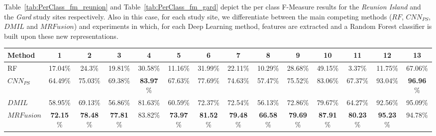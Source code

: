 \documentclass[journal]{IEEEtran}
\newcommand{\method}{$MRFusion$}
\begin{document}
Table~\ref{tab:PerClass_fm_reunion} and Table~\ref{tab:PerClass_fm_gard} depict the per class F-Measure results for the \textit{Reunion Island} and the \textit{Gard} study sites respectively. Also in this case, for each study site, we differentiate between the main competing methods ($RF$, $CNN_{PS}$, $DMIL$ and \method) and experiments in which, for each Deep Learning method, features are extracted and a Random Forest classifier is built upon these new representations. 

\begin{table*}[!ht]
\scriptsize
\centering
\begin{tabular}{|l||c|c|c|c|c|c|c|c|c|c|c|c|c|}
	\hline
\textbf{Method} & 1 & 2 & 3 & 4 & 5 & 6 & 7 & 8 & 9 & 10 & 11 & 12 & 13\\  \hline \hline
RF & 17.04\% & 24.3\% & 19.81\% & 30.58\% & 11.16\% & 31.99\% & 22.11\% & 10.29\% & 28.68\% & 49.15\% & 3.37\% & 11.75\% & 67.06\% \\ \hline
$CNN_{PS}$ & 64.49\% & 75.03\% & 69.38\% & \textbf{83.97}\% & 67.63\% & 77.69\% & 74.63\% & 57.47\% & 75.52\% & 83.06\% & 67.37\% & 93.04\% & \textbf{96.96}\% \\ \hline
$DMIL$ & 58.95\% & 69.13\% & 56.86\% & 81.63\% & 60.59\% & 72.37\% & 72.54\% & 56.13\% & 72.86\% & 79.67\% & 64.27\% & 92.56\% & 95.09\% \\ \hline
\method & \textbf{72.15}\% & \textbf{78.48}\% & \textbf{77.81}\% & 83.82\% & \textbf{73.97}\% & \textbf{81.52}\% & \textbf{79.48}\% & \textbf{66.58}\% & \textbf{79.69}\% & \textbf{87.91}\% & \textbf{80.23}\% & \textbf{95.23}\% & 94.78\% \\ \hline \hline



\end{tabular}
\end{table*}
\end{document}
